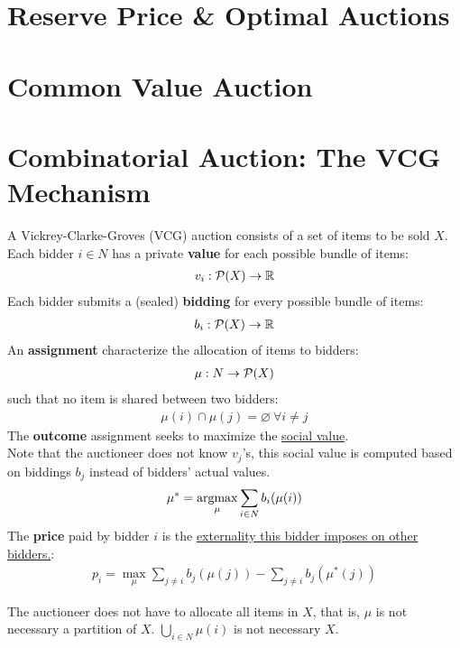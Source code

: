 \documentclass{article}
\begin{document}
	\section{Reserve Price \& Optimal Auctions}
	
	\section{Common Value Auction}
	
	\section{Combinatorial Auction: The VCG Mechanism}
	\begin{definition}
		A Vickrey-Clarke-Groves (VCG) auction consists of a set of items to be sold $X$. Each bidder $i \in N$ has a private \textbf{value} for each possible bundle of items:
		\begin{align}
			v_i: \mathcal{{P}}(X) \to \mathbb{R}
		\end{align}
		Each bidder submits a (sealed) \textbf{bidding} for every possible bundle of items:
		\begin{align}
			b_i: \mathcal{{P}}(X) \to \mathbb{R}
		\end{align}
		An \textbf{assignment} characterize the allocation of items to bidders:
		\begin{align}
			\mu: N \to \mathcal{{P}}(X)
		\end{align}
		such that no item is shared between two bidders:
		\begin{align}
			\mu(i) \cap \mu(j) = \varnothing\ \forall i \neq j
		\end{align}
		The \textbf{outcome} assignment seeks to maximize the \ul{social value}. \\
		Note that the auctioneer does not know $v_j$'s, this social value is computed based on biddings $b_j$ instead of bidders' actual values.
		\begin{align}
			\mu^* = \operatorname*{argmax}_{\mu} \sum_{i \in N} b_i(\mu(i))
		\end{align}
		The \textbf{price} paid by bidder $i$ is the \ul{externality this bidder imposes on other bidders.}:
		\begin{align}
			p_i = \max_\mu \sum_{j \neq i} b_j(\mu(j)) - \sum_{j \neq i}b_j(\mu^*(j))
		\end{align}
	\end{definition}
	
	\begin{remark}
		The auctioneer does not have to allocate all items in $X$, that is, $\mu$ is not necessary a partition of $X$. $\bigcup_{i \in N}\mu(i)$ is not necessary $X$.
	\end{remark}
	
\end{document}
